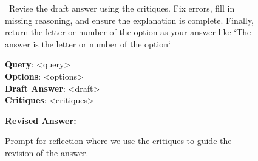 \begin{figure}[t]
    \centering
    \begin{boxK}[colback=royalblue!5!white, colframe=royalblue!75!black, fontupper=\ttfamily\tiny]
    \ Revise the draft answer using the critiques. Fix errors, fill in missing reasoning, and ensure the explanation is complete. Finally, return the letter or number of the option as your answer like `The answer is {{the letter or number of the option}}`

    \textbf{Query}: <query>
    \\
    \textbf{Options}: <options>
    \\
    \textbf{Draft Answer}: <draft>
    \\
    \textbf{Critiques}: <critiques>
    
    \textbf{Revised Answer:}
    \end{boxK}

    \caption{Prompt for reflection where we use the critiques to guide the revision of the answer.}
    \label{fig:gpt_reasoning_prompt}
\end{figure}